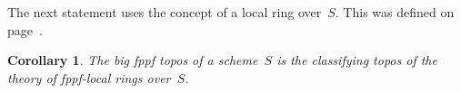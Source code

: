 \documentclass[10pt,reqno,a4paper]{amsbook}
\makeatletter
\theoremstyle{definition}
\theoremstyle{plain}
\newtheorem{cor}[defn]{Corollary}
\newtheorem{thm}[defn]{Theorem}
\theoremstyle{remark}
\newcommand{\placeholder}{\underline{\quad}}
\newcommand{\?}{\,{:}\,}
\renewcommand{\_}{\mathpunct{.}\,}
\newcommand{\lra}{\longrightarrow}
\newcommand{\defeq}{\vcentcolon=}
\renewenvironment{proof}[1][\proofname]{\par
  \pushQED{\qed}%
  \normalfont \topsep6\p@\@plus6\p@\relax
  \trivlist
  \item[\hskip\labelsep
        \itshape
    #1\@addpunct{.}]\ignorespaces
}{%
  \popQED\endtrivlist\@endpefalse
}
\makeatother
\begin{document}
%
%
%
%
%

The next statement uses the concept of a local ring over~$S$. This was defined
on page~\pageref{defn:ring-over-s}.

\begin{cor}\label{cor:big-fpps-topos-classifies}
The big fppf topos of a scheme~$S$ is the classifying topos of the
theory of fppf-local rings over~$S$.\end{cor}
\end{document}
